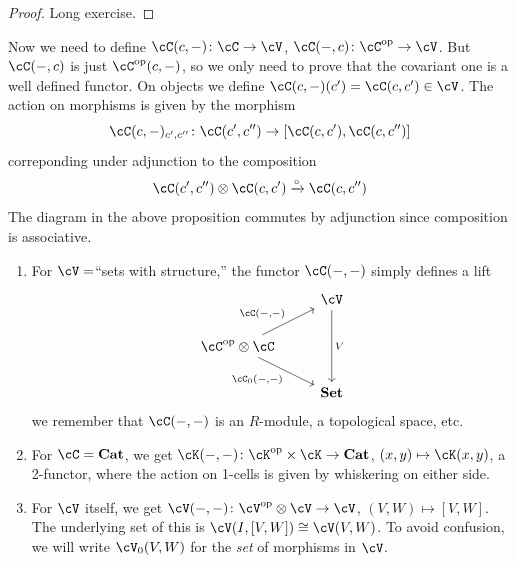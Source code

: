 \documentclass[a4paper,11pt,oneside,openany]{scrbook}
\begin{document}
\begin{proof}
	Long exercise.
\end{proof}
Now we need to define $ \cC(c,-) \from \cC \to \cV $, $ \cC(-,c)\from \cC^{\op}\to \cV $.
But $ \cC(-,c) $ is just $ \cC^{\op}(c,-) $, so we only need to prove that the covariant one is a well defined functor.
On objects we define $ \cC(c,-)(c') = \cC(c,c') \in \cV $.
The action on morphisms is given by the morphism
\begin{displaymath}
	\cC(c,-)_{c',c''} \from \cC(c',c'') \to [\cC(c,c'),\cC(c,c'')]
\end{displaymath}
correponding under adjunction to the composition
\begin{displaymath}
	\cC(c',c'')\otimes\cC(c,c')\xrightarrow{\circ}\cC(c,c'')
\end{displaymath}
The diagram in the above proposition commutes by adjunction since composition is associative.
\begin{exmp}
	\begin{enumerate}[label=\arabic*)]
		\item
		      For $ \cV =  $``sets with structure,'' the functor $ \cC(-,-) $ simply defines a lift
		      \begin{displaymath}
			      \begin{tikzcd}
				      & \cV \arrow[dd, "V"]\\
				      \cC^{\op}\otimes \cC \arrow[ur, "{\cC(-,-)}"]\arrow[dr, "{\cC_0(-,-)}"'] & \\
				      & \Set
			      \end{tikzcd}
		      \end{displaymath}
		      we remember that $ \cC(-,-) $ is an $ R $-module, a topological space, etc.
		\item
		      For $ \cC = \Cat $, we get $ \cK(-,-) \from \cK^{\op}\times \cK \to \Cat $, $ (x,y)\mapsto \cK(x,y) $,
		      a 2-functor, where the action on 1-cells is given by whiskering on either side.
		\item
		      For $ \cV $ itself, we get  $ \cV(-,-) \from \cV^{\op}\otimes \cV \to \cV $, $ (V,W)\mapsto [V,W] $.
		      The underlying set of this is $ \cV(I,[V,W]) \iso \cV(V,W) $.
		      To avoid confusion, we will write $ \cV_0(V,W) $ for the \emph{set} of morphisms in $ \cV $.
	\end{enumerate}
\end{exmp}
\end{document}
